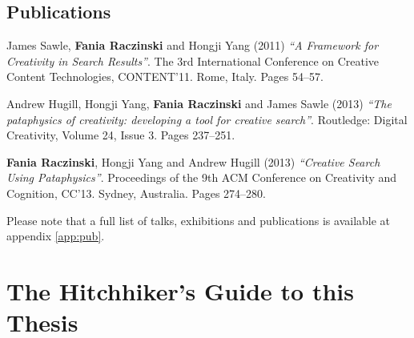 %
%

\subsection{Publications}

James Sawle, \textbf{Fania Raczinski} and Hongji Yang (2011) \emph{``A Framework for Creativity in Search Results''}. The 3rd International Conference on Creative Content Technologies, CONTENT'11. Rome, Italy. Pages 54--57. \autocite{Sawle2011}

Andrew Hugill, Hongji Yang, \textbf{Fania Raczinski} and James Sawle (2013) \emph{``The pataphysics of creativity: developing a tool for creative search''}. Routledge: Digital Creativity, Volume 24, Issue 3. Pages 237--251. \autocite{Hugill2013d}

\textbf{Fania Raczinski}, Hongji Yang and Andrew Hugill (2013) \emph{``Creative Search Using Pataphysics''}. Proceedings of the 9th ACM Conference on Creativity and Cognition, CC'13. Sydney, Australia. Pages 274--280. \autocite{Raczinski2013}

Please note that a full list of talks, exhibitions and publications is available at appendix \ref{app:pub}.


\section{The Hitchhiker's Guide to this Thesis}

